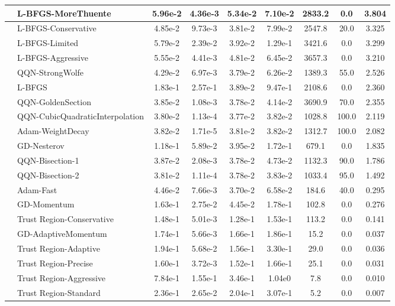 \documentclass{article}
\begin{document}
\begin{longtable}{|l|l|c|c|c|c|c|c|c|}
\hline
 & L-BFGS-MoreThuente & 5.96e-2 & 4.36e-3 & 5.34e-2 & 7.10e-2 & 2833.2 & 0.0 & 3.804 \\
\hline
 & L-BFGS-Conservative & 4.85e-2 & 9.73e-3 & 3.81e-2 & 7.99e-2 & 2547.8 & 20.0 & 3.325 \\
\hline
 & L-BFGS-Limited & 5.79e-2 & 2.39e-2 & 3.92e-2 & 1.29e-1 & 3421.6 & 0.0 & 3.299 \\
\hline
 & L-BFGS-Aggressive & 5.55e-2 & 4.41e-3 & 4.81e-2 & 6.45e-2 & 3657.3 & 0.0 & 3.210 \\
\hline
 & QQN-StrongWolfe & 4.29e-2 & 6.97e-3 & 3.79e-2 & 6.26e-2 & 1389.3 & 55.0 & 2.526 \\
\hline
 & L-BFGS & 1.83e-1 & 2.57e-1 & 3.89e-2 & 9.47e-1 & 2108.6 & 0.0 & 2.360 \\
\hline
 & QQN-GoldenSection & 3.85e-2 & 1.08e-3 & 3.78e-2 & 4.14e-2 & 3690.9 & 70.0 & 2.355 \\
\hline
 & QQN-CubicQuadraticInterpolation & 3.80e-2 & 1.13e-4 & 3.77e-2 & 3.82e-2 & 1028.8 & 100.0 & 2.119 \\
\hline
 & Adam-WeightDecay & 3.82e-2 & 1.71e-5 & 3.81e-2 & 3.82e-2 & 1312.7 & 100.0 & 2.082 \\
\hline
 & GD-Nesterov & 1.18e-1 & 5.89e-2 & 3.95e-2 & 1.72e-1 & 679.1 & 0.0 & 1.835 \\
\hline
 & QQN-Bisection-1 & 3.87e-2 & 2.08e-3 & 3.78e-2 & 4.73e-2 & 1132.3 & 90.0 & 1.786 \\
\hline
 & QQN-Bisection-2 & 3.81e-2 & 1.11e-4 & 3.78e-2 & 3.83e-2 & 1033.4 & 95.0 & 1.492 \\
\hline
 & Adam-Fast & 4.46e-2 & 7.66e-3 & 3.70e-2 & 6.58e-2 & 184.6 & 40.0 & 0.295 \\
\hline
 & GD-Momentum & 1.63e-1 & 2.75e-2 & 4.45e-2 & 1.78e-1 & 102.8 & 0.0 & 0.276 \\
\hline
 & Trust Region-Conservative & 1.48e-1 & 5.01e-3 & 1.28e-1 & 1.53e-1 & 113.2 & 0.0 & 0.141 \\
\hline
 & GD-AdaptiveMomentum & 1.74e-1 & 5.66e-3 & 1.66e-1 & 1.86e-1 & 15.2 & 0.0 & 0.037 \\
\hline
 & Trust Region-Adaptive & 1.94e-1 & 5.68e-2 & 1.56e-1 & 3.30e-1 & 29.0 & 0.0 & 0.036 \\
\hline
 & Trust Region-Precise & 1.60e-1 & 3.72e-3 & 1.52e-1 & 1.66e-1 & 25.1 & 0.0 & 0.031 \\
\hline
 & Trust Region-Aggressive & 7.84e-1 & 1.55e-1 & 3.46e-1 & 1.04e0 & 7.8 & 0.0 & 0.010 \\
\hline
 & Trust Region-Standard & 2.36e-1 & 2.65e-2 & 2.04e-1 & 3.07e-1 & 5.2 & 0.0 & 0.007 \\

\end{longtable}
\end{document}
